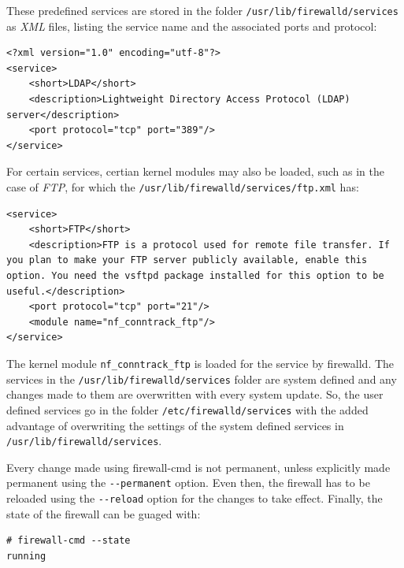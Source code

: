 \noindent
These predefined services are stored in the folder \verb|/usr/lib/firewalld/services| as \textit{XML} files, listing the service name and the associated ports and protocol:

\vspace{-15pt}
\begin{verbatim}
<?xml version="1.0" encoding="utf-8"?>
<service>
	<short>LDAP</short>
	<description>Lightweight Directory Access Protocol (LDAP) server</description>
	<port protocol="tcp" port="389"/>
</service>

\end{verbatim}
\vspace{-10pt}	

\noindent
For certain services, certian kernel modules may also be loaded, such as in the case of \textit{FTP}, for which the \verb|/usr/lib/firewalld/services/ftp.xml| has:

\vspace{-15pt}
\begin{verbatim}
<service>
	<short>FTP</short>
	<description>FTP is a protocol used for remote file transfer. If you plan to make your FTP server publicly available, enable this option. You need the vsftpd package installed for this option to be useful.</description>
	<port protocol="tcp" port="21"/>
	<module name="nf_conntrack_ftp"/>
</service>
\end{verbatim}
\vspace{-10pt}	

\noindent
The kernel module \verb|nf_conntrack_ftp| is loaded for the service by firewalld. The services in the \verb|/usr/lib/firewalld/services| folder are system defined and any changes made to them are overwritten with every system update. So, the user defined services go in the folder \verb|/etc/firewalld/services| with the added advantage of overwriting the settings of the system defined services in \verb|/usr/lib/firewalld/services|. 

Every change made using firewall-cmd is not permanent, unless explicitly made permanent using the \verb|--permanent| option. Even then, the firewall has to be reloaded using the \verb|--reload| option for the changes to take effect. Finally, the state of the firewall can be guaged with:

\vspace{-15pt}
\begin{verbatim}
# firewall-cmd --state
running
\end{verbatim}
\vspace{-10pt}	


